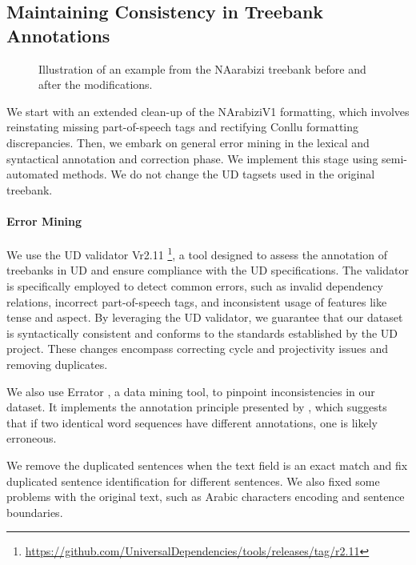 \documentclass[11pt]{article}
\begin{document}
\subsection{Maintaining Consistency in Treebank Annotations}
\begin{figure}
\centering

\caption{\label{tree}
Illustration of an example from the NAarabizi treebank before and after the modifications.
}
\end{figure}
We start with an extended clean-up of the NArabiziV1 formatting, which involves reinstating missing part-of-speech tags and rectifying Conllu formatting discrepancies. Then, we embark on general error mining in the lexical and syntactical annotation and correction phase. We implement this stage using semi-automated methods. We do not change the UD tagsets used in the original treebank.

\paragraph{Error Mining} We use the UD  validator Vr2.11 \footnote{\url{https://github.com/UniversalDependencies/tools/releases/tag/r2.11}}, a tool designed to assess the annotation of treebanks in UD and ensure compliance with the UD specifications. The validator is specifically employed to detect common errors, such as invalid dependency relations, incorrect part-of-speech tags, and inconsistent usage of features like tense and aspect. By leveraging the UD validator, we guarantee that our dataset is syntactically consistent and conforms to the standards established by the UD project. These changes encompass correcting cycle and projectivity issues and removing duplicates.

We also use Errator \cite{wisniewski2018errator}, a data mining tool, to pinpoint inconsistencies in our dataset.
It implements the annotation principle presented by \citet{boyd2008detecting}, which suggests that if two identical word sequences have different annotations, one is likely erroneous.

We remove the duplicated sentences when the text field is an exact match and fix duplicated sentence identification for different sentences. We also fixed some problems with the original text, such as Arabic characters encoding and sentence boundaries.  
\end{document}
